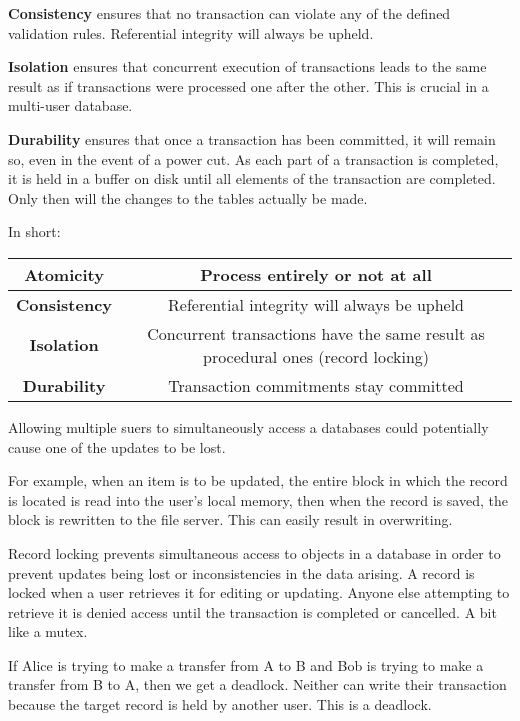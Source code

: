 \documentclass[../main.tex]{subfile}
\begin{document}
\textbf{Consistency} ensures that no transaction can violate any of the defined validation rules. Referential integrity will always be upheld.

\textbf{Isolation} ensures that concurrent execution of transactions leads to the same result as if transactions were processed one after the other. This is crucial in a multi-user database.

\textbf{Durability} ensures that once a transaction has been committed, it will remain so, even in the event of a power cut. As each part of a transaction is completed, it is held in a buffer on disk until all elements of the transaction are completed. Only then will the changes to the tables actually be made.

In short:
\begin{center}
\begin{tabular}{|c|c|}
	\hline
	\textbf{Atomicity} & Process entirely or not at all\\
	\hline
	\textbf{Consistency} & Referential integrity will always be upheld\\
	\hline
	\textbf{Isolation} & Concurrent transactions have the same result as procedural ones (record locking)\\
	\hline
	\textbf{Durability} & Transaction commitments stay committed\\
	\hline
\end{tabular}
\end{center}


Allowing multiple suers to simultaneously access a databases could potentially cause one of the updates to be lost.

For example, when an item is to be updated, the entire block in which the record is located is read into the user's local memory, then when the record is saved, the block is rewritten to the file server. This can easily result in overwriting.

Record locking prevents simultaneous access to objects in a database in order to prevent updates being lost or inconsistencies in the data arising. A record is locked when a user retrieves it for editing or updating. Anyone else attempting to retrieve it is denied access until the transaction is completed or cancelled. A bit like a mutex.

If Alice is trying to make a transfer from A to B and Bob is trying to make a transfer from B to A, then we get a deadlock. Neither can write their transaction because the target record is held by another user. This is a deadlock.
\end{document}

